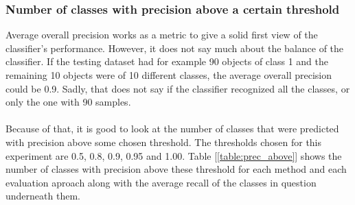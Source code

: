 \documentclass[11pt]{article}
\begin{document}
      \subsubsection{Number of classes with precision above a certain threshold}
        Average overall precision works as a metric to give a solid first view of the classifier's performance. However, it does not say much about the balance of the classifier. If the testing dataset had for example 90 objects of class 1 and the remaining 10 objects were of 10 different classes, the average overall precision could be 0.9. Sadly, that does not say if the classifier recognized all the classes, or only the one with 90 samples.
        \\~\\
        Because of that, it is good to look at the number of classes that were predicted with precision above some chosen threshold. The thresholds chosen for this experiment are 0.5, 0.8, 0.9, 0.95 and 1.00. Table [\ref{table:prec_above}] shows the number of classes with precision above these threshold for each method and each evaluation aproach along with the average recall of the classes in question underneath them.
\end{document}
